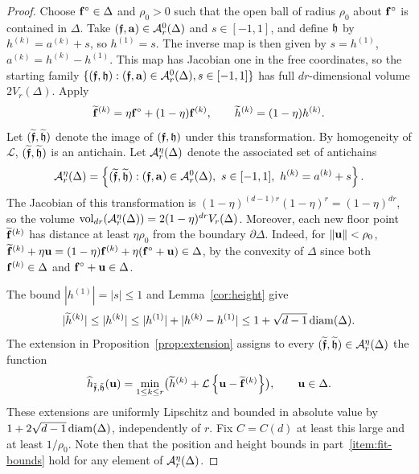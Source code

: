 \documentclass[11pt,letterpaper]{article}
\begin{document}
\begin{proof}
      Choose $\mathbf f^\circ\in\Delta$ and $\rho_0>0$ such that the open ball of radius $\rho_0$ about $\mathbf f^\circ$ is contained in $\Delta$.
      Take $(\bm{\mathfrak f},\mathbf a)\in\mathcal A_r^0(\Delta)$ and $s\in[-1,1]$, and define $\mathfrak h$ by $h^{(k)}=a^{(k)}+s$, so $h^{(1)}=s$. The inverse map is then given by $s=h^{(1)}$, $a^{(k)}=h^{(k)}-h^{(1)}$. This map has Jacobian one in the free coordinates, so the starting family $\{(\bm{\mathfrak f},\mathfrak h):(\bm{\mathfrak f},\mathbf a)\in\mathcal A_r^0(\Delta),s\in[-1,1]\}$ has full $dr$-dimensional volume $2V_r(\Delta)$. Apply
      \[
            \widetilde {\mathbf f}^{(k)}=\eta\mathbf f^\circ+(1-\eta)\mathbf f^{(k)}, \qquad \widetilde h^{(k)}=(1-\eta)h^{(k)}.
      \]
      Let $(\widetilde {\bm{\mathfrak f}},\widetilde {\mathfrak h})$ denote the image of $(\bm{\mathfrak f},\mathfrak h)$ under this transformation. By homogeneity of $\mathcal L$, $(\widetilde {\bm{\mathfrak f}},\widetilde {\mathfrak h})$ is an antichain. Let $\mathcal A_{r}^{\eta}(\Delta)$ denote the associated set of antichains
      \[\cA_{r}^{\eta}(\Delta)=\left\{(\widetilde \ff,\widetilde \fh):(\ff,\mathbf a)\in\cA_r^0(\Delta),\ s\in[-1,1],\ h^{(k)}=a^{(k)}+s\right\}.\]
      The Jacobian of this transformation is $(1-\eta)^{(d-1)r}(1-\eta)^r=(1-\eta)^{dr}$, so the volume $\operatorname{vol}_{dr}(\mathcal A_{r}^{\eta}(\Delta))=2(1-\eta)^{dr}V_r(\Delta)$. Moreover, each new floor point $\widetilde{\mathbf f}^{(k)}$ has distance at least $\eta\rho_0$ from the boundary $\partial\Delta$. Indeed, for $\|\mathbf u\|<\rho_0$, $\widetilde{\mathbf f}^{(k)}+\eta\mathbf u=(1-\eta)\mathbf f^{(k)}+\eta(\mathbf f^\circ+\mathbf u)\in\Delta$, by the convexity of $\Delta$ since both $\mathbf f^{(k)}\in\Delta$ and $\mathbf f^\circ+\mathbf u\in\Delta$.

      The bound $|h^{(1)}|=|s|\le1$ and Lemma~\ref{cor:height} give
      \[
            |\widetilde h^{(k)}|\le |h^{(k)}|\le |h^{(1)}|+|h^{(k)}-h^{(1)}|
            \le1+\sqrt{d-1}\operatorname{diam}(\Delta).
      \]
      The extension in Proposition~\ref{prop:extension} assigns to every $(\widetilde{\bm{\mathfrak f}},\widetilde{\mathfrak h})\in\mathcal A_r^\eta(\Delta)$ the function
      \begin{equation}\label{eq:def-ext}
            \widehat h_{\tilde{\bm{\mathfrak f}},\tilde{\mathfrak h}}(\mathbf u)=\min_{1\le k\le r} \bigl(\widetilde{h}^{(k)}+\mathcal L\left\{\mathbf u-\widetilde{\mathbf f}^{(k)}\right\}\bigr), \qquad \mathbf u\in\Delta.
      \end{equation}
      These extensions are uniformly Lipschitz and bounded in absolute value by $1+2\sqrt{d-1}\operatorname{diam}(\Delta)$, independently of $r$. Fix $C=C(d)$ at least this large and at least $1/\rho_0$. Note then that the position and height bounds in part~\ref{item:fit-bounds} hold for any element of $\mathcal A_{r}^{\eta}(\Delta)$.


\end{proof}
\end{document}
